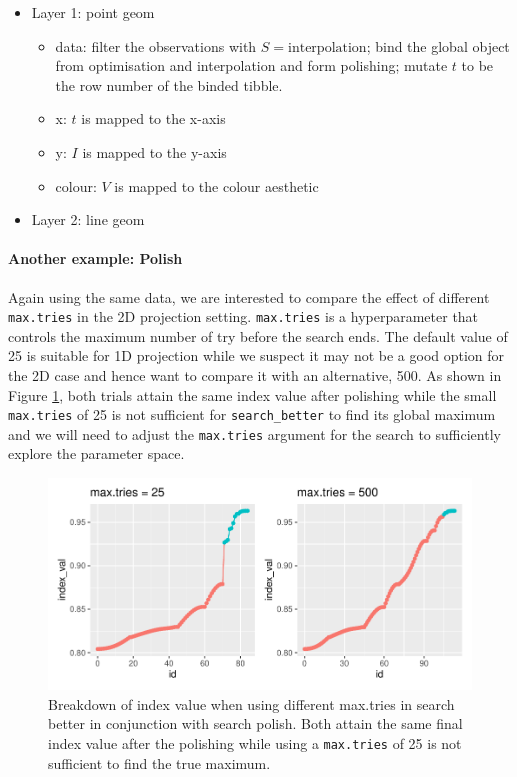 \documentclass[12pt]{article}
\providecommand{\tightlist}{%
  \setlength{\itemsep}{0pt}\setlength{\parskip}{0pt}}
\begin{document}
\begin{itemize}
\tightlist
\item
  Layer 1: point geom

  \begin{itemize}
  \tightlist
  \item
    data: filter the observations with \(S = \text{interpolation}\);
    bind the global object from optimisation and interpolation and form
    polishing; mutate \(t\) to be the row number of the binded tibble.
  \item
    x: \(t\) is mapped to the x-axis
  \item
    y: \(I\) is mapped to the y-axis
  \item
    colour: \(V\) is mapped to the colour aesthetic
  \end{itemize}
\item
  Layer 2: line geom
\end{itemize}

\hypertarget{another-example-polish}{%
\paragraph{Another example: Polish}\label{another-example-polish}}

Again using the same data, we are interested to compare the effect of
different \texttt{max.tries} in the 2D projection setting.
\texttt{max.tries} is a hyperparameter that controls the maximum number
of try before the search ends. The default value of 25 is suitable for
1D projection while we suspect it may not be a good option for the 2D
case and hence want to compare it with an alternative, 500. As shown in
Figure \ref{trace-compare}, both trials attain the same index value
after polishing while the small \texttt{max.tries} of 25 is not
sufficient for \texttt{search\_better} to find its global maximum and we
will need to adjust the \texttt{max.tries} argument for the search to
sufficiently explore the parameter space.

\begin{figure}
\centering
\includegraphics{paper_files/figure-latex/polish-1.pdf}
\caption{\label{trace-compare}Breakdown of index value when using
different max.tries in search better in conjunction with search polish.
Both attain the same final index value after the polishing while using a
\texttt{max.tries} of 25 is not sufficient to find the true maximum.}
\end{figure}
\end{document}
